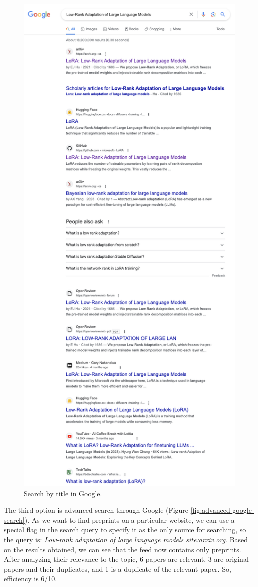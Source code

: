 \documentclass{article}
\begin{document}
    \begin{figure}[H]
        \centering
        \includegraphics[width=0.65\linewidth]{img/search_google.png}
        \caption{Search by title in Google.}
        \label{fig:google-search}
    \end{figure}

    The third option is advanced search through Google (Figure \ref{fig:advanced-google-search}). As we want to find preprints on a particular website, we can use a special flag in the search query to specify it as the only source for searching, so the query is: \textit{Low-rank adaptation of large language models site:arxiv.org}. Based on the results obtained, we can see that the feed now contains only preprints. After analyzing their relevance to the topic, 6 papers are relevant, 3 are original papers and their duplicates, and 1 is a duplicate of the relevant paper. So, efficiency is 6/10.
\end{document}

